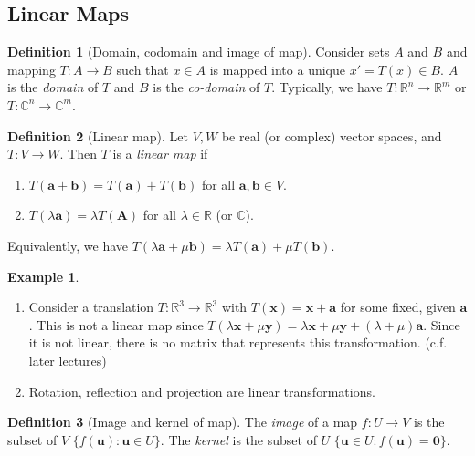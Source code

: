 \documentclass[a4paper]{article}
\theoremstyle{definition}
\newtheorem*{defi}{Definition}
\newtheorem*{eg}{Example}
\newcommand{\mb}[1]{\mathbf{#1}}
\newcommand{\R}{\mathbb{R}}
\newcommand{\C}{\mathbb{C}}
\begin{document}
\subsection{Linear Maps}
\begin{defi}[Domain, codomain and image of map]
  Consider sets $A$ and $B$ and mapping $T:A\to B$ such that $x\in A$ is mapped into a unique $x' = T(x)\in B$. $A$ is the \emph{domain} of $T$ and $B$ is the \emph{co-domain} of $T$. Typically, we have $T:\R^n \to \R^m$ or $T:\C^n\to \C^m$.
\end{defi}

\begin{defi}[Linear map]
  Let $V, W$ be real (or complex) vector spaces, and $T: V\to W$. Then $T$ is a \emph{linear map} if
  \begin{enumerate}
    \item $T(\mb{a + b}) = T(\mb{a}) + T(\mb{b})$ for all $\mb{a, b}\in V$.
    \item $T(\lambda\mb{a}) = \lambda T(\mb{A})$ for all $\lambda \in \R$ (or $\C$).
  \end{enumerate}
  Equivalently, we have $T(\lambda\mb{a} + \mu\mb{b}) = \lambda T(\mb{a}) + \mu T(\mb{b})$.
\end{defi}

\begin{eg}\leavevmode
  \begin{enumerate}
  \item Consider a translation $T:\R^3 \to \R^3$ with $T(\mb{x}) = \mb{x + a}$ for some fixed, given $\mb{a}$. This is not a linear map since $T(\lambda\mb{x} + \mu\mb{y}) = \lambda \mb{x} + \mu \mb{y} + (\lambda + \mu)\mb{a}$. Since it is not linear, there is no matrix that represents this transformation. (c.f. later lectures)
  \item Rotation, reflection and projection are linear transformations.
  \end{enumerate}
\end{eg}

\begin{defi}[Image and kernel of map]
  The \emph{image} of a map $f: U\to V$ is the subset of $V$ $\{f(\mb{u}): \mb{u}\in U\}$. The \emph{kernel} is the subset of $U$ $\{\mb{u}\in U: f(\mb{u}) = \mb{0}\}$.
\end{defi}
\end{document}
